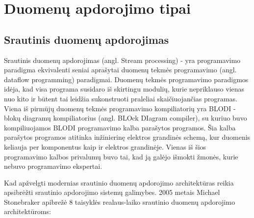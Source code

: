 \documentclass{VUMIFPSkursinis}
\begin{document}
\section{Duomenų apdorojimo tipai}

\subsection{Srautinis duomenų apdorojimas} \label{strprocess}

    Srautinis duomenų apdorojimas (angl. Stream processing) - yra programavimo paradigma ekvivalenti seniai aprašytai duomenų tekmės programavimo (angl. dataflow programming) paradigmai\cite{shortstreamproc}. 
Duomenų tekmės programavimo paradigmos idėja, kad visa programa susidaro iš skirtingu modulių, kurie nepriklauso vienas nuo kito ir būtent tai leidžia sukonstruoti praleliai skaičiuojančias programas. 
Viena iš pirmūjų duomenų tekmės programavimo kompiliatorių yra BLODI - blokų diagramų kompiliatorius (angl. BLOck DIagram compiler), su kuriuo buvo kompiliuojamos BLODI programavimo kalba parašytos programos. 
Šia kalba parašytos programos atitinka inžinierinę elektros grandinės schemą, kur duomenis keliauja per komponentus kaip ir elektros grandinėje. Vienas iš šios programavimo kalbos privalumų buvo tai, 
kad ją galėjo išmokti žmonės, kurie nebuvo programavimo ekspertai\cite{kelly1961block}. \par
Kad apžvelgti modernias srautinio duomenų apdorojimo architektūras reikia apsibrėžti srautinio apdorojimo sistemų galimybes.
2005 metais Michael Stonebraker apibrežė 8 taisyklės realaus-laiko srautinio duomenų apdorojimo architektūroms\cite{stonebraker20058}:
\end{document}
